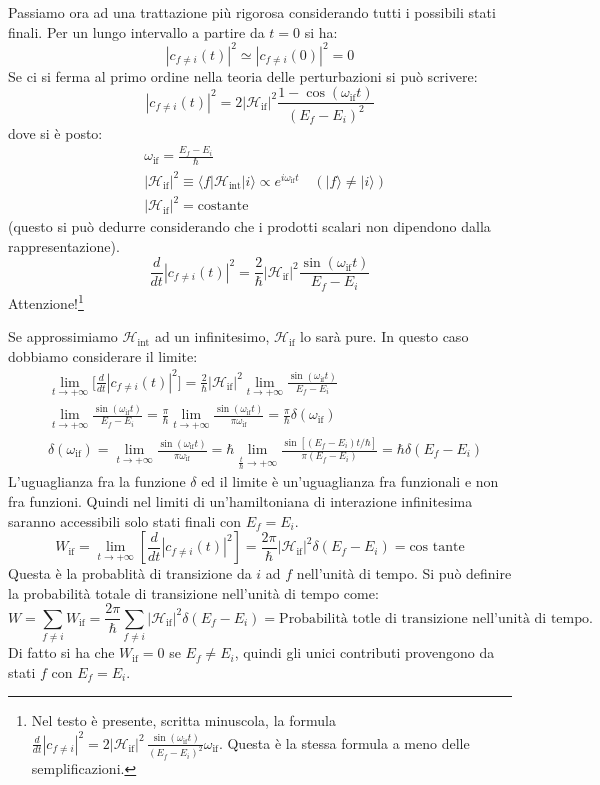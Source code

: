 Passiamo ora ad una trattazione più rigorosa considerando tutti i possibili 
stati finali. Per un lungo intervallo a partire da $t=0$ si ha:
\[
|c_{f\neq i}(t)|^2\simeq |c_{f\neq i}(0)|^2=0
\]
Se ci si ferma al primo ordine nella teoria delle perturbazioni si può 
scrivere:
\[
|c_{f\neq 
i}(t)|^2=2|\mathcal{H}_{\text{if}}|^2\frac{1-\cos(\omega_{\text{if}}t)}{(E_f-E_i
)^2}
\]
dove si è posto:
\begin{align*}
&\omega_{\text{if}}=\frac{E_f-E_i}{\hbar}\\
&|\mathcal{H}_{\text{if}}|^2\equiv\langle 
f|\mathcal{H}_{\text{int}}|i\rangle\propto e^{i\omega_{\text{if}}t}\quad 
(|f\rangle\neq|i\rangle)\\
&|\mathcal{H}_{\text{if}}|^2=\text{costante}
\end{align*}
(questo si può dedurre considerando che i prodotti scalari non dipendono dalla 
rappresentazione).
\[
\frac{d}{dt}|c_{f\neq 
i}(t)|^2=\frac{2}{\hbar}|\mathcal{H}_{\text{if}}|^2\frac{\sin(\omega_{\text{if}}
t)}{E_f-E_i}
\]
Attenzione!\footnote{Nel testo è presente, scritta minuscola, la formula
  $\frac{d}{dt}|c_{f\neq i}|^2=
2|\mathcal{H}_{\text{if}}|^2\,\frac{\sin(\omega_{\text{if}}t)}{(E_f-E_i)^2
}\omega_{\text{if}}$. Questa è la stessa formula a meno delle semplificazioni.}

Se approssimiamo $\mathcal{H}_{\text{int}}$ ad un infinitesimo, 
$\mathcal{H}_{\text{if}}$ lo sarà pure.
In questo caso dobbiamo considerare il limite:
\begin{align*}
&\lim_{t\rightarrow+\infty}\bigl[\frac{d}{dt}|c_{f\neq 
i}(t)|^2\bigr]=
\frac{2}{\hbar}|\mathcal{H}_{\text{if}}|^2\lim_{t\rightarrow+\infty}
\frac{\sin(\omega_{\text{if}}t)}{E_f-E_i}\\
&\lim_{t\rightarrow+\infty}\frac{\sin(\omega_{\text{if}}t)}{E_f-E_i}=
\frac{\pi}{\hbar}\lim_{t\rightarrow+\infty}\frac{\sin(\omega_{\text{if}}t)}{\pi
\omega_{\text{if}}}=\frac{\pi}{\hbar}\delta(\omega_{\text{if}})\\
&\delta(\omega_{\text{if}})=\lim_{t\rightarrow+\infty}
\frac{\sin(\omega_{\text{if}}t)}{\pi\omega_{\text{if}}}=\hbar\lim_{\frac{t}{\hbar}
\rightarrow+\infty}\frac{\sin[(E_f-E_i)t/\hbar]}{\pi(E_f-E_i)}=\hbar\delta(E_f-E_i)
\end{align*}
L'uguaglianza fra la funzione $\delta$ ed il limite è un'uguaglianza fra 
funzionali e non fra funzioni.
Quindi nel limiti di un'hamiltoniana di interazione 
infinitesima saranno accessibili solo stati finali con $E_f=E_i$.
\[
W_{\text{if}}=\lim_{t\rightarrow+\infty}[\frac{d}{dt}|c_{f\neq 
i}(t)|^2]=\frac{2\pi}{\hbar}|\mathcal{H}_{\text{if}}|^2\delta(E_f-E_i)=\text{cos
tante}
\]
Questa è la probablità di transizione  da $i$ ad $f$ nell'unità di tempo. Si 
può definire la probabilità totale di transizione nell'unità di tempo come:
\[
W=\sum_{f\neq i}W_{\text{if}}=\frac{2\pi}{\hbar}\sum_{f\neq 
i}|\mathcal{H}_{\text{if}}|^2\delta(E_f-E_i)=\text{Probabilità totle di 
transizione nell'unità di tempo.}
\]
Di fatto si ha che $W_{\text{if}}=0$ se $E_f\neq E_i$, quindi gli unici 
contributi provengono da stati $f$ con $E_f=E_i$.

